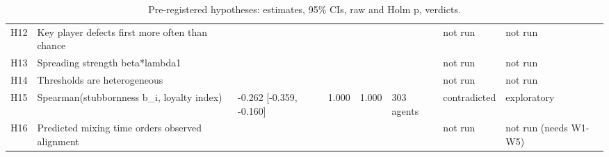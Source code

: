 \begin{table}[t]
\begin{tabular}{llllllll}
H12 & Key player defects first more often than chance &  &  &  &  & not run & not run \\
H13 & Spreading strength beta*lambda1 &  &  &  &  & not run & not run \\
H14 & Thresholds are heterogeneous &  &  &  &  & not run & not run \\
H15 & Spearman(stubbornness b\_i, loyalty index) & -0.262 [-0.359, -0.160] & 1.000 & 1.000 & 303 agents & contradicted & exploratory \\
H16 & Predicted mixing time orders observed alignment &  &  &  &  & not run & not run (needs W1-W5) \\
\bottomrule
\end{tabular}
\caption{Pre-registered hypotheses: estimates, 95\% CIs, raw and Holm p, verdicts.}
\label{tab:T1_hypotheses}
\end{table}